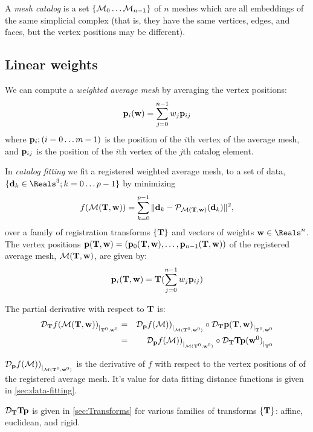 \label{sec:Averaging}

A {\it mesh catalog} is a set $\{ {\mathcal M}_0 \ldots {\mathcal M}_{n-1} \}$
of $n$ meshes which are all embeddings
of the same simplicial complex
(that is, they have the same vertices, edges, and faces,
but the vertex positions may be different).

\subsection{Linear weights}
\label{sec:Linear-weights}

We can compute a {\it weighted average mesh} by averaging the vertex positions:
\begin{equation}
{\mathbf p}_i({\mathbf w}) = \sum_{j=0}^{n-1} w_j {\mathbf p}_{ij}
\end{equation}
where ${\mathbf p}_{i}; (i=0 \ldots m-1)$ is the position of the $i$th vertex of the average mesh,
and ${\mathbf p}_{ij}$ is the position of the $i$th vertex of the $j$th catalog element.

In {\it catalog fitting} we fit a registered weighted average mesh,
to a set of data, $\{ \d_k \in \Reals^3; k=0 \ldots p-1 \}$
by minimizing
\begin{equation}
f({\mathcal M}({\mathbf T},{\mathbf w})) = \sum_{k=0}^{p-1} \| {\mathbf d}_k - {\mathcal P}_{{\mathcal M}({\mathbf T},{\mathbf w})} ({\mathbf d}_k) \|^2 ,
\end{equation}
over a family of registration transforms $\{{\mathbf T}\}$
and vectors of weights $\w \in \Reals^n$.
The vertex positions ${\mathbf p}({\mathbf T},{\mathbf w}) = ({\mathbf p}_0({\mathbf T},{\mathbf w}), \ldots , {\mathbf p}_{n-1}({\mathbf T},{\mathbf w}))$
of the registered average mesh, ${\mathcal M}({\mathbf T},{\mathbf w})$, are given by:
\begin{equation}
{\mathbf p}_i({\mathbf T},{\mathbf w}) = {\mathbf T} ( \sum_{j=0}^{n-1} w_j {\mathbf p}_{ij} )
\end{equation}

The partial derivative with respect to ${\mathbf T}$
is:
\begin{eqnarray}
{\mathcal D}_{{\mathbf T}}{f({\mathcal M}({\mathbf T},{\mathbf w}))}_{\mid_{{\mathbf T}^0,{\mathbf w}^0}}
& = &
{\mathcal D}_{{\mathbf p}}{f({\mathcal M}))}_{\mid_{{\mathcal M}({\mathbf T}^0,{\mathbf w}^0)}}
\circ
{\mathcal D}_{{\mathbf T}}{{\mathbf p}({\mathbf T},{\mathbf w})}_{\mid_{{\mathbf T}^0,{\mathbf w}^0}}
\\
& = &
{\mathcal D}_{{\mathbf p}}{f({\mathcal M}))}_{\mid_{{\mathcal M}({\mathbf T}^0,{\mathbf w}^0)}}
\circ
{\mathcal D}_{{\mathbf T}}{{\mathbf T}{\mathbf p}({\mathbf w}^0)}_{\mid_{{\mathbf T}^0}}
\nonumber
\end{eqnarray}

${\mathcal D}_{{\mathbf p}}{f({\mathcal M}))}_{\mid_{{\mathcal M}({\mathbf T}^0,{\mathbf w}^0)}}$ is the derivative of $f$ with respect to
the vertex positions of of the registered average mesh.
It's value for data fitting distance functions
is given in \autoref{sec:data-fitting}.

${\mathcal D}_{{\mathbf T}}{{\mathbf T}{\mathbf p}}$ is given in \autoref{sec:Transforms}
for various families of transforms $\{{\mathbf T}\}$: affine, euclidean, and rigid.

